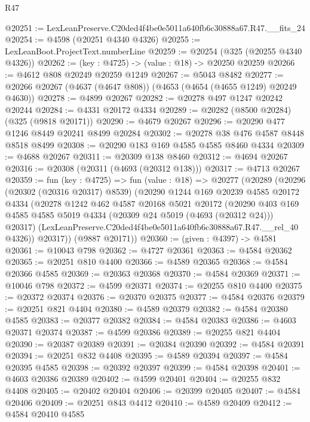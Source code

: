 \begin{lexlean}{R47}
\begin{coremodule}
@20251 := LexLeanPreserve.C20ded4f4be0e5011a640fb6c30888a67.R47.__fits_24
@20254 := @4598 (@20251 @4340 @4326)
@20255 := LexLeanBoot.ProjectText.numberLine
@20259 := @20254 (@325 (@20255 @4340 @4326))
@20262 := (key : @4725) -> (value : @18) -> @20250 @20259
@20266 := @4612 @808 @20249 @20259 @1249
@20267 := @5043 @8482
@20277 := @20266 @20267 (@4637 (@4647 @808)) (@4653 (@4654 (@4655 @1249) @20249 @4630))
@20278 := @4899 @20267
@20282 := @20278 @497 @1247 @20242 @20244
@20284 := @4331 @20172 @4334
@20289 := @20282 (@8500 @20284) (@325 (@9818 @20171))
@20290 := @4679 @20267
@20296 := @20290 @477 @1246 @8449 @20241 @8499 @20284
@20302 := @20278 @38 @476 @4587 @8448 @8518 @8499
@20308 := @20290 @183 @169 @4585 @4585 @8460 @4334
@20309 := @4688 @20267
@20311 := @20309 @138 @8460
@20312 := @4694 @20267
@20316 := @20308 (@20311 (@4693 (@20312 @138)))
@20317 := @4713 @20267
@20359 := fun (key : @4725) =>
  fun (value : @18) =>
  @20277
    (@20289
      (@20296
        (@20302 (@20316 @20317) @8539)
        (@20290
          @1244
          @169
          @20239
          @4585
          @20172
          @4334
          (@20278
            @1242
            @462
            @4587
            @20168
            @5021
            @20172
            (@20290
              @403
              @169
              @4585
              @4585
              @5019
              @4334
              (@20309 @24 @5019 (@4693 (@20312 @24)))
              @20317)
            (LexLeanPreserve.C20ded4f4be0e5011a640fb6c30888a67.R47.__rel_40 @4326))
          @20317))
      (@9887 @20171))
@20360 := (given : @4397) -> @4581
@20361 := @10043 @798
@20362 := @4727 @20361
@20363 := @4584 @20362
@20365 := @20251 @810 @4400
@20366 := @4589 @20365
@20368 := @4584 @20366 @4585
@20369 := @20363 @20368
@20370 := @4584 @20369
@20371 := @10046 @798
@20372 := @4599 @20371
@20374 := @20255 @810 @4400
@20375 := @20372 @20374
@20376 := @20370 @20375
@20377 := @4584 @20376
@20379 := @20251 @821 @4404
@20380 := @4589 @20379
@20382 := @4584 @20380 @4585
@20383 := @20377 @20382
@20384 := @4584 @20383
@20386 := @4603 @20371 @20374
@20387 := @4599 @20386
@20389 := @20255 @821 @4404
@20390 := @20387 @20389
@20391 := @20384 @20390
@20392 := @4584 @20391
@20394 := @20251 @832 @4408
@20395 := @4589 @20394
@20397 := @4584 @20395 @4585
@20398 := @20392 @20397
@20399 := @4584 @20398
@20401 := @4603 @20386 @20389
@20402 := @4599 @20401
@20404 := @20255 @832 @4408
@20405 := @20402 @20404
@20406 := @20399 @20405
@20407 := @4584 @20406
@20409 := @20251 @843 @4412
@20410 := @4589 @20409
@20412 := @4584 @20410 @4585

\end{coremodule}
\end{lexlean}
